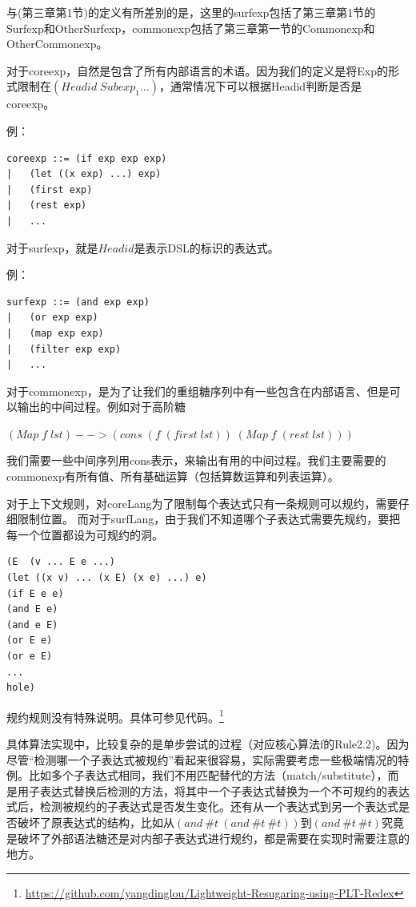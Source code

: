 与(第三章第1节)的定义有所差别的是，这里的surfexp包括了第三章第1节的Surfexp和OtherSurfexp，commonexp包括了第三章第一节的Commonexp和OtherCommonexp。

对于coreexp，自然是包含了所有内部语言的术语。因为我们的定义是将Exp的形式限制在$(Headid\;Subexp_{1}\ldots)$，通常情况下可以根据Headid判断是否是coreexp。

例：
\begin{verbatim}
coreexp ::= (if exp exp exp)
|   (let ((x exp) ...) exp)
|   (first exp)
|   (rest exp)
|   ...
\end{verbatim}

对于surfexp，就是$Headid$是表示DSL的标识的表达式。

例：
\begin{verbatim}
surfexp ::= (and exp exp)
|   (or exp exp)
|   (map exp exp)
|   (filter exp exp)
|   ...
\end{verbatim}

对于commonexp，是为了让我们的重组糖序列中有一些包含在内部语言、但是可以输出的中间过程。例如对于高阶糖

$(Map\;f\;lst)-->(cons\;(f\;(first\;lst))\;(Map\;f\;(rest\;lst)))$

\begin{flushleft}
	我们需要一些中间序列用cons表示，来输出有用的中间过程。我们主要需要的commonexp有所有值、所有基础运算（包括算数运算和列表运算）。
\end{flushleft}

对于上下文规则，对coreLang为了限制每个表达式只有一条规则可以规约，需要仔细限制位置。
而对于surfLang，由于我们不知道哪个子表达式需要先规约，要把每一个位置都设为可规约的洞。
\begin{verbatim}
(E  (v ... E e ...)
(let ((x v) ... (x E) (x e) ...) e)
(if E e e)
(and E e)
(and e E)
(or E e)
(or e E)
...
hole)
\end{verbatim}

规约规则没有特殊说明。具体可参见代码。\footnote{\url{https://github.com/yangdinglou/Lightweight-Resugaring-using-PLT-Redex}}

具体算法实现中，比较复杂的是单步尝试的过程（对应核心算法f的Rule2.2)。因为尽管“检测哪一个子表达式被规约”看起来很容易，实际需要考虑一些极端情况的特例。比如多个子表达式相同，我们不用匹配替代的方法（match/substitute），而是用子表达式替换后检测的方法，将其中一个子表达式替换为一个不可规约的表达式后，检测被规约的子表达式是否发生变化。还有从一个表达式到另一个表达式是否破坏了原表达式的结构，比如从$(and~\#t~(and~\#t~\#t))$到$(and~\#t~\#t)$究竟是破坏了外部语法糖还是对内部子表达式进行规约，都是需要在实现时需要注意的地方。